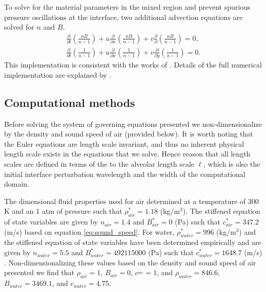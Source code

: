 To solve for the material parameters in the mixed region and prevent
spurious pressure oscillations at the interface, two additional
advection equations are solved for $n$ and $B$.
\begin{subequations} \label{usbe_lung_eosvar_advection}%
  \begin{align}%
    \frac{\partial}{\partial t}\left(\frac{n B}{n-1}\right)+u\frac{\partial}{\partial x}\left(\frac{n B}{n-1}\right)+v\frac{\partial}{\partial }\left(\frac{n B}{n-1}\right) = 0,\\
    \frac{\partial}{\partial t}\left(\frac{1}{n-1}\right)+u\frac{\partial}{\partial x}\left(\frac{1}{n-1}\right)+v\frac{\partial}{\partial y}\left(\frac{1}{n-1}\right) = 0. 
  \end{align}%
\end{subequations}%
This implementation is consistent with the works of \cite{Abgrall1996,
  Shyue2001, Beig2015}. Details of the full numerical implementation
are explained by \cite{HenrydeFrahan2015}.
%
\subsection{Computational  methods}%
\label{subsec:numerical_methods}%
Before solving the system of governing equations presented we
non-dimensionalize by the density and sound speed of air (provided
below). It is worth noting that the Euler equations are length scale
invariant, and thus no inherent physical length scale exists in the
equations that we solve. Hence reason that all length scales are
defined in terms of the to the alveolar length scale $\ell$, which is
also the initial interface perturbation wavelength and the width of
the computational domain.

The dimensional fluid properties used for air determined at a
temperature of $300$ K and an $1$ atm of pressure such that
$\rho^*_{air}=1.18$ (kg/m$^3$). The stiffened equation of state
variables are given by $n_{air}=1.4$ and $B^*_{air} = 0$ (Pa) such
that $c^*_{air}=347.2$ (m/s) based on equation
\eqref{eq:sound_speed}. For water, $\rho^*_{water}=996$ (kg/m$^3$) and
the stiffened equation of state variables have been determined
empirically and are given by $n_{water}=5.5$ and
$B^*_{water} = 492115000$ (Pa) such that $c^*_{water}=1648.7$ (m/s)
\citep{Marsh1980,holian1984t,Cocchi1996}. Non-dimensionalizing these
values based on the density and sound speed of air presented we find
that $\rho_{air}=1$, $B_{air} = 0$, $c^_{air}=1$, and
$\rho_{water}=846.6$, $B_{water} = 3469.1$, and $c_{water}=4.75$.
 
